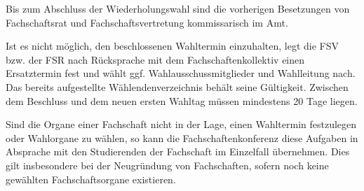 \documentclass[%
draft,%
multilinesections%
]{fswo}
\begin{document}
\begin{contract}
Bis zum Abschluss der Wiederholungswahl sind die vorherigen Besetzungen von Fachschaftsrat und Fachschaftsvertretung kommissarisch im Amt.

Ist es nicht möglich, den beschlossenen Wahltermin einzuhalten, legt die FSV bzw. der FSR nach Rücksprache mit dem Fachschaftenkollektiv einen Ersatztermin fest und wählt ggf. Wahlausschussmitglieder und Wahlleitung nach.
Das bereits aufgestellte Wählendenverzeichnis behält seine Gültigkeit.
Zwischen dem Beschluss und dem neuen ersten Wahltag müssen mindestens 20 Tage liegen.

Sind die Organe einer Fachschaft nicht in der Lage, einen Wahltermin festzulegen oder Wahlorgane zu wählen, so kann die Fachschaftenkonferenz diese Aufgaben in Absprache mit den Studierenden der Fachschaft im Einzelfall übernehmen.
Dies gilt insbesondere bei der Neugründung von Fachschaften, sofern noch keine gewählten Fachschaftsorgane existieren.
\end{contract}
\end{document}
